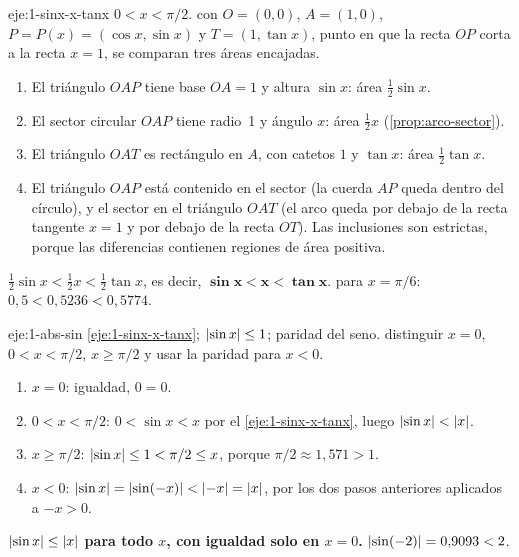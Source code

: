 \begin{solucion}{eje:1-sinx-x-tanx}
\datos $0<x<\pi/2$.
\planteamiento con $O=(0,0)$, $A=(1,0)$, $P=P(x)=(\cos x,\sin x)$ y $T=(1,\tan x)$, punto en que la recta $OP$ corta a la recta $x=1$, se comparan tres áreas encajadas.
\pasos
\begin{enumerate}[label=\arabic*.]
  \item El triángulo $OAP$ tiene base $OA=1$ y altura $\sin x$: área $\frac12\sin x$.
  \item El sector circular $OAP$ tiene radio~1 y ángulo $x$: área $\frac12x$ (\cref{prop:arco-sector}).
  \item El triángulo $OAT$ es rectángulo en $A$, con catetos $1$ y $\tan x$: área $\frac12\tan x$.
  \item El triángulo $OAP$ está contenido en el sector (la cuerda $AP$ queda dentro del círculo), y el sector en el triángulo $OAT$ (el arco queda por debajo de la recta tangente $x=1$ y por debajo de la recta $OT$). Las inclusiones son estrictas, porque las diferencias contienen regiones de área positiva.
\end{enumerate}
\resultado $\frac12\sin x<\frac12x<\frac12\tan x$, es decir, $\mathbf{\sin x<x<\tan x}$.
\comprobacion para $x=\pi/6$: $0{,}5<0{,}5236<0{,}5774$.
\end{solucion}

\begin{solucion}{eje:1-abs-sin}
\datos \cref{eje:1-sinx-x-tanx}; $\lvert\sin x\rvert\le1$; paridad del seno.
\planteamiento distinguir $x=0$, $0<x<\pi/2$, $x\ge\pi/2$ y usar la paridad para $x<0$.
\pasos
\begin{enumerate}[label=\arabic*.]
  \item $x=0$: igualdad, $0=0$.
  \item $0<x<\pi/2$: $0<\sin x<x$ por el \cref{eje:1-sinx-x-tanx}, luego $\lvert\sin x\rvert<\lvert x\rvert$.
  \item $x\ge\pi/2$: $\lvert\sin x\rvert\le1<\pi/2\le x$, porque $\pi/2\approx1{,}571>1$.
  \item $x<0$: $\lvert\sin x\rvert=\lvert\sin(-x)\rvert<\lvert-x\rvert=\lvert x\rvert$, por los dos pasos anteriores aplicados a $-x>0$.
\end{enumerate}
\resultado \textbf{$\lvert\sin x\rvert\le\lvert x\rvert$ para todo $x$, con igualdad solo en $x=0$.}
\comprobacion $\lvert\sin(-2)\rvert=0{,}9093<2$.
\end{solucion}

